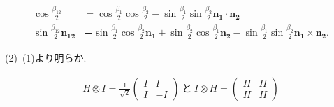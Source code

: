 \begin{ex}
    \begin{align*}
        \cos \frac{\beta_{12}}{2}
         & = \cos \frac{\beta_1}{2}\cos \frac{\beta_2}{2}
        -
        \sin \frac{\beta_1}{2} \sin\frac{\beta_2}{2} \bm{n_1} \cdot \bm{n_2} \\
        \sin \frac{\beta_{12}}{2}\bm{n_{12}}
         & ＝
        \sin \frac{\beta_1}{2}\cos \frac{\beta_2}{2} \bm{n_1}
        +
        \sin \frac{\beta_2}{2}\cos \frac{\beta_1}{2} \bm{n_2}
        -
        \sin \frac{\beta_1}{2} \sin\frac{\beta_2}{2} \bm{n_1} \times \bm{n_2}.
    \end{align*}
    \par
    (2)\
    (1)より明らか.
\end{ex}

\begin{ex}
    \label{ex4.16}
    \begin{align*}
        H \otimes I
        =
        \frac{1}{\sqrt{2}}
        \begin{pmatrix}
            I & I  \\
            I & -I
        \end{pmatrix}
        \
        \mathrm{と}
        \
        I \otimes H
        =
        \begin{pmatrix}
            H & H \\
            H & H
        \end{pmatrix}
    \end{align*}
\end{ex}


